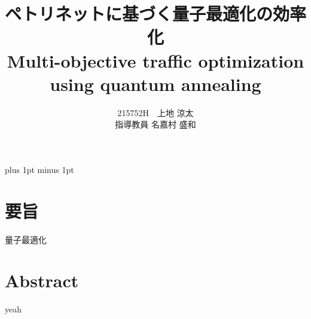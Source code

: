 \documentclass[a4j,12pt]{jreport}
\title{ペトリネットに基づく量子最適化の効率化\\
Multi-objective traffic optimization using quantum annealing}
\author{215752H　上地 涼太  \\ 指導教員 {名嘉村 盛和} }
\begin{document}
\maketitle
\baselineskip 17pt plus 1pt minus 1pt


\setcounter{page}{0}

\section*{要旨}
量子最適化
\clearpage
\section*{Abstract}
yeah
\listoffigures		%
\listoftables		%










%

%



%
\end{document}
